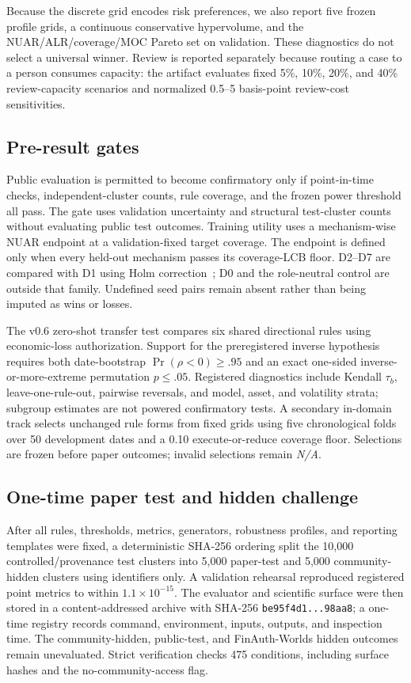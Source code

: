 Because the discrete grid encodes risk preferences, we also report five frozen profile grids, a continuous conservative hypervolume, and the NUAR/ALR/coverage/MOC Pareto set on validation. These diagnostics do not select a universal winner. Review is reported separately because routing a case to a person consumes capacity: the artifact evaluates fixed 5\%, 10\%, 20\%, and 40\% review-capacity scenarios and normalized 0.5--5 basis-point review-cost sensitivities.

\subsection{Pre-result gates}
Public evaluation is permitted to become confirmatory only if point-in-time checks, independent-cluster counts, rule coverage, and the frozen power threshold all pass. The gate uses validation uncertainty and structural test-cluster counts without evaluating public test outcomes. Training utility uses a mechanism-wise NUAR endpoint at a validation-fixed target coverage. The endpoint is defined only when every held-out mechanism passes its coverage-LCB floor. D2--D7 are compared with D1 using Holm correction~\cite{holm1979simple}; D0 and the role-neutral control are outside that family. Undefined seed pairs remain absent rather than being imputed as wins or losses.

The v0.6 zero-shot transfer test compares six shared directional rules using economic-loss authorization. Support for the preregistered inverse hypothesis requires both date-bootstrap $\Pr(\rho<0)\ge .95$ and an exact one-sided inverse-or-more-extreme permutation $p\le .05$. Registered diagnostics include Kendall $\tau_b$, leave-one-rule-out, pairwise reversals, and model, asset, and volatility strata; subgroup estimates are not powered confirmatory tests. A secondary in-domain track selects unchanged rule forms from fixed grids using five chronological folds over 50 development dates and a 0.10 execute-or-reduce coverage floor. Selections are frozen before paper outcomes; invalid selections remain \textit{N/A}.

\subsection{One-time paper test and hidden challenge}
After all rules, thresholds, metrics, generators, robustness profiles, and reporting templates were fixed, a deterministic SHA-256 ordering split the 10,000 controlled/provenance test clusters into 5,000 paper-test and 5,000 community-hidden clusters using identifiers only. A validation rehearsal reproduced registered point metrics to within $1.1\times10^{-15}$. The evaluator and scientific surface were then stored in a content-addressed archive with SHA-256 \texttt{be95f4d1...98aa8}; a one-time registry records command, environment, inputs, outputs, and inspection time. The community-hidden, public-test, and FinAuth-Worlds hidden outcomes remain unevaluated. Strict verification checks 475 conditions, including surface hashes and the no-community-access flag.
